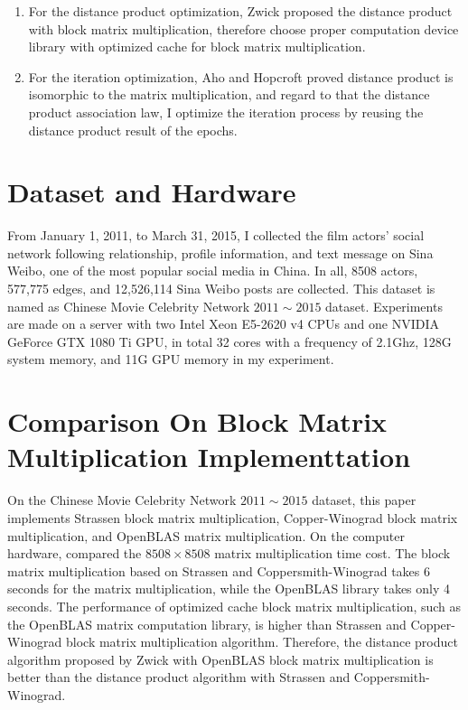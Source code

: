 \documentclass[10pt,twocolumn,letterpaper]{article}
\begin{document}
\begin{enumerate}
\item For the distance product optimization, Zwick proposed the distance product with block matrix multiplication, therefore choose proper computation device library with optimized cache for block matrix multiplication.
\item For the iteration optimization, Aho and Hopcroft proved distance product is isomorphic to the matrix multiplication, and regard to that the distance product association law, I optimize the iteration process by reusing the distance product result of the epochs.
\end{enumerate}


\section{Dataset and Hardware}

From January 1, 2011, to March 31, 2015, I collected the film actors' social network following relationship, profile information,
and text message on Sina Weibo, one of the most popular social media in China.
In all, 8508 actors, 577,775 edges, and 12,526,114 Sina Weibo posts are collected.
This dataset is named as Chinese Movie Celebrity Network $2011\sim2015$ dataset.
Experiments are made on a server with two Intel Xeon E5-2620 v4 CPUs and one NVIDIA GeForce GTX 1080 Ti GPU, in total 32 cores with a frequency of 2.1Ghz, 128G system memory, and 11G GPU memory in my experiment.



\section{Comparison On Block Matrix Multiplication Implementtation}

On the Chinese Movie Celebrity Network $2011\sim2015$ dataset, this paper implements Strassen block matrix multiplication,
Copper-Winograd block matrix multiplication, and OpenBLAS matrix multiplication.
On the computer hardware, compared the $8508\times8508$ matrix multiplication time cost.
The block matrix multiplication based on Strassen and Coppersmith-Winograd takes 6 seconds for the matrix multiplication,
while the OpenBLAS library takes only 4 seconds.
The performance of optimized cache block matrix multiplication, such as the OpenBLAS matrix computation library,
is higher than Strassen and Copper-Winograd block matrix multiplication algorithm.
Therefore, the distance product algorithm proposed by Zwick with OpenBLAS block matrix multiplication is better than
the distance product algorithm with Strassen and Coppersmith-Winograd.
\end{document}
